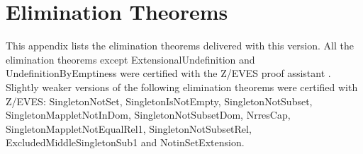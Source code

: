 \documentclass[a4paper,12pt, fleqn]{article}
\begin{document}
\appendix

 \pagebreak

 \pagebreak

 \pagebreak

\section{\label{etl}Elimination Theorems}
This appendix lists the elimination theorems delivered with this version. All the elimination theorems except ExtensionalUndefinition and  UndefinitionByEmptiness were certified with the Z/EVES proof assistant \cite{ZEVES}. Slightly weaker versions of the following elimination theorems were certified with Z/EVES: SingletonNotSet, SingletonIsNotEmpty, SingletonNotSubset, SingletonMappletNotInDom, SingletonNotSubsetDom, NrresCap, SingletonMappletNotEqualRel1, SingletonNotSubsetRel, ExcludedMiddleSingletonSub1 and NotinSetExtension.

 \pagebreak



\end{document}
